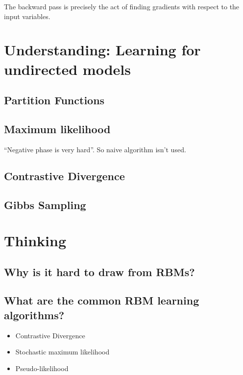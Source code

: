 \documentclass[11pt]{article}
\begin{document}
The backward pass is precisely the act of finding gradients with respect to the input variables.




\section{Understanding: Learning for undirected models}
\label{sec:orge8a0432}
\subsection{Partition Functions}
\label{sec:orge3c30ad}
\subsection{Maximum likelihood}
\label{sec:org3bc2985}
``Negative phase is very hard''. So naive algorithm isn't used.

\subsection{Contrastive Divergence}
\label{sec:org02400d8}
\subsection{Gibbs Sampling}
\label{sec:org7870ee8}



\section{Thinking}
\label{sec:org97e97c5}
\subsection{Why is it hard to draw from RBMs?}
\label{sec:orgfc49b53}
\subsection{What are the common RBM learning algorithms?}
\label{sec:org6e60d2c}
\begin{itemize}
\item Contrastive Divergence
\item Stochastic maximum likelihood
\item Pseudo-likelihood
\end{itemize}
\end{document}
